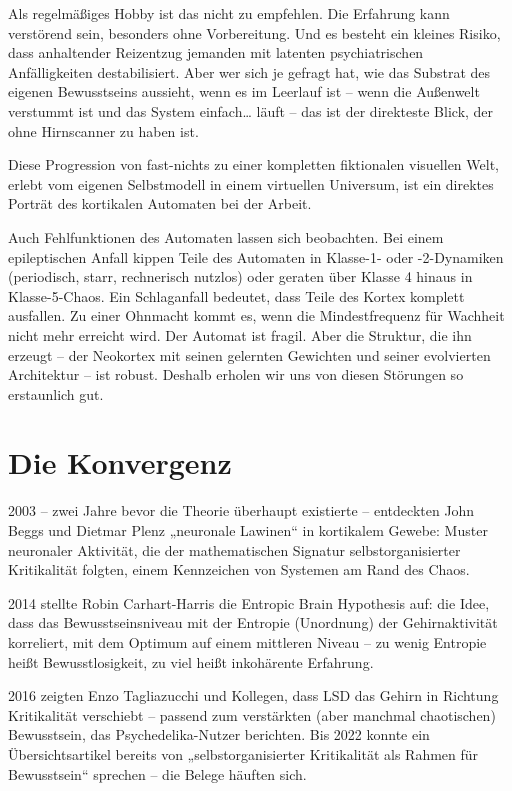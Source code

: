 \documentclass[11pt, twoside, openright]{book}
\begin{document}
Als regelmäßiges Hobby ist das nicht zu empfehlen. Die Erfahrung kann verstörend sein, besonders ohne Vorbereitung. Und es besteht ein kleines Risiko, dass anhaltender Reizentzug jemanden mit latenten psychiatrischen Anfälligkeiten destabilisiert. Aber wer sich je gefragt hat, wie das Substrat des eigenen Bewusstseins aussieht, wenn es im Leerlauf ist -- wenn die Außenwelt verstummt ist und das System einfach\ldots{} läuft -- das ist der direkteste Blick, der ohne Hirnscanner zu haben ist.

Diese Progression von fast-nichts zu einer kompletten fiktionalen visuellen Welt, erlebt vom eigenen Selbstmodell in einem virtuellen Universum, ist ein direktes Porträt des kortikalen Automaten bei der Arbeit.

Auch Fehlfunktionen des Automaten lassen sich beobachten. Bei einem epileptischen Anfall kippen Teile des Automaten in Klasse-1- oder -2-Dynamiken (periodisch, starr, rechnerisch nutzlos) oder geraten über Klasse 4 hinaus in Klasse-5-Chaos. Ein Schlaganfall bedeutet, dass Teile des Kortex komplett ausfallen. Zu einer Ohnmacht kommt es, wenn die Mindestfrequenz für Wachheit nicht mehr erreicht wird. Der Automat ist fragil. Aber die Struktur, die ihn erzeugt -- der Neokortex mit seinen gelernten Gewichten und seiner evolvierten Architektur -- ist robust. Deshalb erholen wir uns von diesen Störungen so erstaunlich gut.

\section*{Die Konvergenz}

2003 -- zwei Jahre bevor die Theorie überhaupt existierte -- entdeckten John Beggs und Dietmar Plenz „neuronale Lawinen“ in kortikalem Gewebe: Muster neuronaler Aktivität, die der mathematischen Signatur selbstorganisierter Kritikalität folgten, einem Kennzeichen von Systemen am Rand des Chaos.

2014 stellte Robin Carhart-Harris die Entropic Brain Hypothesis auf: die Idee, dass das Bewusstseinsniveau mit der Entropie (Unordnung) der Gehirnaktivität korreliert, mit dem Optimum auf einem mittleren Niveau -- zu wenig Entropie heißt Bewusstlosigkeit, zu viel heißt inkohärente Erfahrung.

2016 zeigten Enzo Tagliazucchi und Kollegen, dass LSD das Gehirn in Richtung Kritikalität verschiebt -- passend zum verstärkten (aber manchmal chaotischen) Bewusstsein, das Psychedelika-Nutzer berichten. Bis 2022 konnte ein Übersichtsartikel bereits von „selbstorganisierter Kritikalität als Rahmen für Bewusstsein“ sprechen -- die Belege häuften sich.
\end{document}
